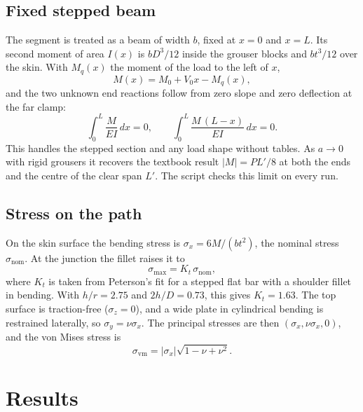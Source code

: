 \documentclass[10pt,a4paper]{article}
\begin{document}
\subsection{Fixed stepped beam}
The segment is treated as a beam of width $b$, fixed at $x = 0$ and $x = L$. Its second moment of area $I(x)$ is $bD^3/12$ inside the grouser blocks and $bt^3/12$ over the skin. With $M_q(x)$ the moment of the load to the left of $x$,
\begin{equation}
  M(x) = M_0 + V_0 x - M_q(x),
\end{equation}
and the two unknown end reactions follow from zero slope and zero deflection at the far clamp:
\begin{equation}
  \int_0^L \frac{M}{EI}\,dx = 0, \qquad \int_0^L \frac{M\,(L - x)}{EI}\,dx = 0 .
\end{equation}
This handles the stepped section and any load shape without tables. As $a \to 0$ with rigid grousers it recovers the textbook result $|M| = PL'/8$ at both the ends and the centre of the clear span $L'$. The script checks this limit on every run.

\subsection{Stress on the path}
On the skin surface the bending stress is $\sigma_x = 6M/(bt^2)$, the nominal stress $\sigma_\text{nom}$. At the junction the fillet raises it to
\begin{equation}
  \sigma_\text{max} = K_t\, \sigma_\text{nom},
\end{equation}
where $K_t$ is taken from Peterson's fit for a stepped flat bar with a shoulder fillet in bending. With $h/r = 2.75$ and $2h/D = 0.73$, this gives $K_t = 1.63$. The top surface is traction-free ($\sigma_z = 0$), and a wide plate in cylindrical bending is restrained laterally, so $\sigma_y = \nu\sigma_x$. The principal stresses are then $(\sigma_x, \nu\sigma_x, 0)$, and the von Mises stress is
\begin{equation}
  \sigma_\text{vm} = |\sigma_x|\sqrt{1 - \nu + \nu^2}.
\end{equation}

\section{Results}
\end{document}
